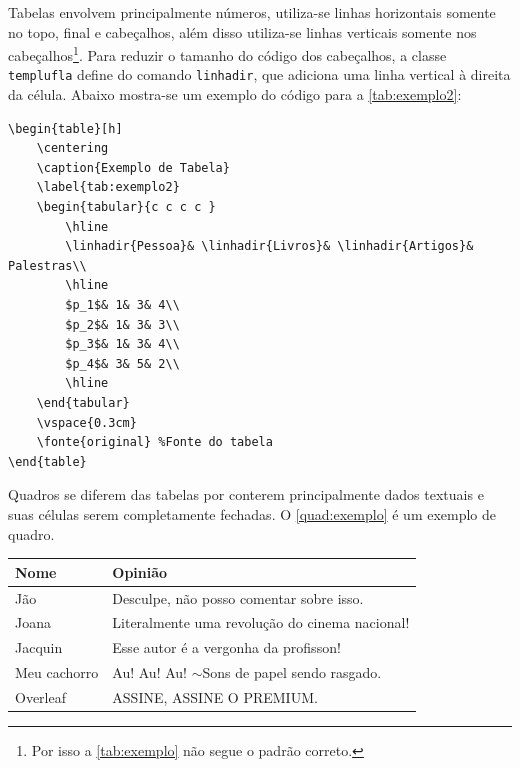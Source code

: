 Tabelas envolvem principalmente números, utiliza-se linhas horizontais somente no topo, final e cabeçalhos, além disso utiliza-se linhas verticais somente nos cabeçalhos\footnote{Por isso a \autoref{tab:exemplo} não segue o padrão correto.}. Para reduzir o tamanho do código dos cabeçalhos, a classe \texttt{templufla} define do comando \texttt{linhadir}, que adiciona uma linha vertical à direita da célula. Abaixo mostra-se um exemplo do código para a \autoref{tab:exemplo2}:
\begin{lstlisting}[language={[LaTeX]Tex}]
\begin{table}[h]
	\centering
	\caption{Exemplo de Tabela} 
	\label{tab:exemplo2}
	\begin{tabular}{c c c c }
		\hline
		\linhadir{Pessoa}& \linhadir{Livros}& \linhadir{Artigos}& Palestras\\
		\hline
		$p_1$& 1& 3& 4\\
		$p_2$& 1& 3& 3\\
		$p_3$& 1& 3& 4\\
		$p_4$& 3& 5& 2\\
		\hline 
	\end{tabular}
	\vspace{0.3cm}
	\fonte{original} %Fonte do tabela
\end{table}
\end{lstlisting}


Quadros se diferem das tabelas por conterem principalmente dados textuais e suas células serem completamente fechadas. O \autoref{quad:exemplo} é um exemplo de quadro.

\begin{quadro}[h]
\centering
\caption{Opiniões sobre esse template}\label{quad:exemplo}
  \begin{tabular}{|l|p{9cm}|}
    \hline 
    \rowcolor[gray]{.9}
    \bf Nome& \bf Opinião\\
    \hline
    Jão& Desculpe, não posso comentar sobre isso.\\
    \hline
    Joana& Literalmente uma revolução do cinema nacional!\\
    \hline
    Jacquin& Esse autor é a vergonha da profisson!\\
    \hline
    Meu cachorro& Au! Au! Au! $\sim$Sons de papel sendo rasgado.\\
    \hline
    Overleaf& ASSINE, ASSINE O PREMIUM.\\
    \hline
    \end{tabular}
    
    \vspace{0.3cm}
\end{quadro}


